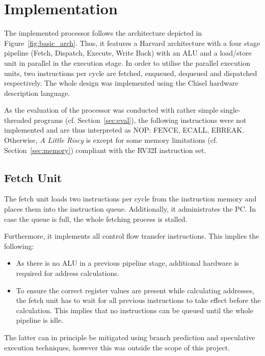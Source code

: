 \documentclass[conference]{IEEEtran}
\begin{document}
\section{Implementation} \label{sec:implementation}
The implemented processor follows the architecture depicted in Figure~\ref{fig:basic_arch}. Thus, it features a Harvard architecture with a four stage pipeline (Fetch, Dispatch, Execute, Write Back) with an ALU and a load/store unit in parallel in the execution stage. In order to utilise the parallel execution units, two instructions per cycle are fetched, enqueued, dequeued and dispatched respectively. The whole design was implemented using the Chisel hardware description language.

As the evaluation of the processor was conducted with rather simple single-threaded programs (cf. Section~\ref{sec:eval}), the following instructions were not implemented and are thus interpreted as NOP: FENCE, ECALL, EBREAK. Otherwise, \emph{A Little Riscy} is except for some memory limitations (cf. Section~\ref{sec:memory}) compliant with the RV32I instruction set.

\subsection{Fetch Unit}
The fetch unit loads two instructions per cycle from the instruction memory and places them into the instruction queue. Additionally, it administrates the PC. In case the queue is full, the whole fetching process is stalled.

Furthermore, it implements all control flow transfer instructions. This implies the following:
\begin{itemize}
	\item As there is no ALU in a previous pipeline stage, additional hardware is required for address calculations.
	\item To ensure the correct register values are present while calculating addresses, the fetch unit has to wait for all previous instructions to take effect before the calculation. This implies that no instructions can be queued until the whole pipeline is idle.
\end{itemize}

The latter can in principle be mitigated using branch prediction and speculative execution techniques, however this was outside the scope of this project.
\end{document}
